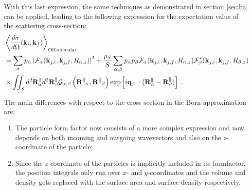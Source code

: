 With this last expression, the same techniques as demonstrated in section \ref{sec:ba} can be applied, leading to the following expression for the expectation value of the scattering cross-section:
\begin{align*}
  & \left\langle \frac{d\sigma}{d\Omega}(\mathbf{k}_i,\mathbf{k}_f) \right\rangle_{\text{Off-specular}}  \\
  & = \sum_\alpha p_\alpha \left\lvert \mathcal{F}_\alpha(\mathbf{k}_{j,i},\mathbf{k}_{j,f}, R_{\alpha,z})\right\rvert ^2 + \frac{\rho_S}{S}\sum_{\alpha,\beta} p_\alpha p_\beta \mathcal{F}_\alpha (\mathbf{k}_{j,i},\mathbf{k}_{j,f}, R_{\alpha,z})\mathcal{F}_\beta^*(\mathbf{k}_{j,i},\mathbf{k}_{j,f}, R_{\beta,z}) \\
  & \times \iint_S d^2\mathbf{R}_\alpha^\parallel d^2\mathbf{R}_\beta^\parallel \mathcal{G}_{\alpha ,\beta}\left( \mathbf{R^\parallel}_{\alpha} , \mathbf{R^\parallel}_{\beta} \right) \exp \left[ i\mathbf{q}_{j\parallel}\cdot (\mathbf{R}_\alpha^\parallel - \mathbf{R}_\beta^\parallel ) \right] \; .
\end{align*}

The main differences with respect to the cross-section in the Born approximation are:
\begin{enumerate}
  \item The particle form factor now consists of a more complex expression and now depends on both incoming and outgoing wavevectors and also on the $z$-coordinate of the particle;
  \item Since the $z$-coordinate of the particles is implicitly included in its formfactor, the position integrals only run over $x$- and $y$-coordinates and the volume and density gets replaced with the surface area and surface density respectively.
\end{enumerate}


